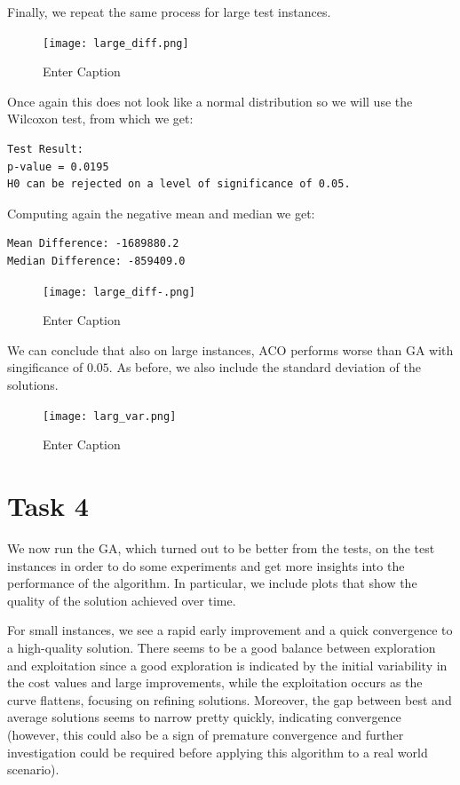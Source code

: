 \documentclass{article}
\begin{document}
Finally, we repeat the same process for large test instances.
\begin{figure}[H]
    \centering
    \texttt{[image: large\_diff.png]}
    \caption{Enter Caption}
    \label{fig:enter-label}
\end{figure}
Once again this does not look like a normal distribution so we will use the Wilcoxon test, from which we get:
\begin{verbatim}
Test Result: 
p-value = 0.0195 
H0 can be rejected on a level of significance of 0.05.  
\end{verbatim}
Computing again the negative mean and median we get:
\begin{verbatim}
Mean Difference: -1689880.2 
Median Difference: -859409.0 
\end{verbatim}
\begin{figure}[H]
    \centering
    \texttt{[image: large\_diff-.png]}
    \caption{Enter Caption}
    \label{fig:enter-label}
\end{figure}

We can conclude that also on large instances, ACO performs worse than GA with singificance of $0.05$.
As before, we also include the standard deviation of the solutions.

\begin{figure}[H]
    \centering
    \texttt{[image: larg\_var.png]}
    \caption{Enter Caption}
    \label{fig:enter-label}
\end{figure}

\section{Task 4}

We now run the GA, which turned out to be better from the tests, on the test instances in order to do some experiments and get more insights into the performance of the algorithm. In particular, we include plots that show the quality of the solution achieved over time.

For small instances, we see a rapid early improvement and a quick convergence to a high-quality solution. There seems to be a good balance between exploration and exploitation since a good exploration is indicated by the initial variability in the cost values and large improvements, while the exploitation occurs as the curve flattens, focusing on refining solutions. Moreover, the gap between best and average solutions seems to narrow pretty quickly, indicating convergence (however, this could also be a sign of premature convergence and further investigation could be required before applying this algorithm to a real world scenario).
\end{document}

